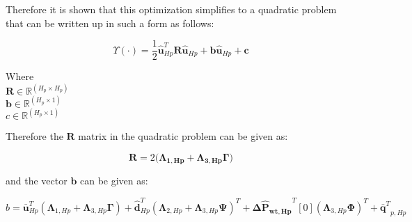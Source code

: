 Therefore it is shown that this optimization simplifies to a quadratic problem that can be written up in such a form as follows:

\begin{equation}
  \Upsilon(\cdot) =  \frac{1}{2} \bm{\hat{u}}_{Hp}^{T} \bm{R} \bm{\hat{u}}_{Hp} + \bm{b} \bm{\hat{u}}_{Hp} + \bm{c}
\end{equation}

\begin{minipage}[t]{0.28\textwidth}
Where\\
\hspace*{8mm} $\bm{R} \in \pmb{\mathbb{R}}^{(H_p \times H_p)} $ \\
\hspace*{8mm} $\bm{b} \in \pmb{\mathbb{R}}^{(H_p \times 1)} $ \\
\hspace*{8mm} $c \in \pmb{\mathbb{R}}^{(H_p \times 1)} $
\end{minipage}

Therefore the $\bm{R}$ matrix in the quadratic problem can be given as:

\begin{equation}
  \bm{R} = 2\Big(\bm{\Lambda}_{\bm{1,Hp}} + \bm{\Lambda}_{\bm{3,Hp}} \bm{\Gamma}\Big) 
\end{equation}

and the vector $\bm{b}$ can be given as:

\begin{equation}
  b = \bm{\bar{u}}_{Hp}^{T}(\bm{\Lambda}_{1,Hp} + \bm{\Lambda}_{3,Hp} \bm{\Gamma} ) + \bm{\hat{d}}_{Hp}^{T}(\bm{\Lambda}_{2,Hp} + \bm{\Lambda}_{3,Hp} \bm{\Psi} )^{T}
  + \bm{\Delta \hat{P}_{wt,Hp}}^{T}[0] (\bm{\Lambda}_{3,Hp} \bm{\Phi})^{T} + {\bm{\bar{q}}^{T}}_{p,Hp}
\end{equation}